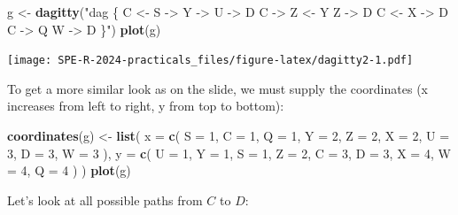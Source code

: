 \documentclass[
]{book}
\newenvironment{Shaded}{\begin{snugshade}}{\end{snugshade}}
\newcommand{\AttributeTok}[1]{\textcolor[rgb]{0.13,0.29,0.53}{#1}}
\newcommand{\DecValTok}[1]{\textcolor[rgb]{0.00,0.00,0.81}{#1}}
\newcommand{\FunctionTok}[1]{\textcolor[rgb]{0.13,0.29,0.53}{\textbf{#1}}}
\newcommand{\NormalTok}[1]{#1}
\newcommand{\OtherTok}[1]{\textcolor[rgb]{0.56,0.35,0.01}{#1}}
\newcommand{\SpecialCharTok}[1]{\textcolor[rgb]{0.81,0.36,0.00}{\textbf{#1}}}
\newcommand{\StringTok}[1]{\textcolor[rgb]{0.31,0.60,0.02}{#1}}
\begin{document}
\begin{Shaded}
\begin{Highlighting}[]
\NormalTok{g }\OtherTok{\textless{}{-}} \FunctionTok{dagitty}\NormalTok{(}\StringTok{"dag \{}
\StringTok{    C \textless{}{-} S {-}\textgreater{} Y {-}\textgreater{} U {-}\textgreater{} D}
\StringTok{    C {-}\textgreater{} Z \textless{}{-} Y}
\StringTok{    Z {-}\textgreater{} D}
\StringTok{    C \textless{}{-} X {-}\textgreater{} D}
\StringTok{    C {-}\textgreater{} Q}
\StringTok{    W {-}\textgreater{} D}
\StringTok{  \}"}\NormalTok{)}
\FunctionTok{plot}\NormalTok{(g)}
\end{Highlighting}
\end{Shaded}

\texttt{[image: SPE-R-2024-practicals\_files/figure-latex/dagitty2-1.pdf]}

To get a more similar look as on the slide, we must supply the coordinates (x increases from left to right, y from top to bottom):

\begin{Shaded}
\begin{Highlighting}[]
\FunctionTok{coordinates}\NormalTok{(g) }\OtherTok{\textless{}{-}} 
  \FunctionTok{list}\NormalTok{(}
    \AttributeTok{x =} 
      \FunctionTok{c}\NormalTok{(}
        \AttributeTok{S =} \DecValTok{1}\NormalTok{, }\AttributeTok{C =} \DecValTok{1}\NormalTok{, }\AttributeTok{Q =} \DecValTok{1}\NormalTok{, }\AttributeTok{Y =} \DecValTok{2}\NormalTok{, }\AttributeTok{Z =} \DecValTok{2}\NormalTok{, }
        \AttributeTok{X =} \DecValTok{2}\NormalTok{, }\AttributeTok{U =} \DecValTok{3}\NormalTok{, }\AttributeTok{D =} \DecValTok{3}\NormalTok{, }\AttributeTok{W =} \DecValTok{3}
\NormalTok{      ),}
    \AttributeTok{y =} 
      \FunctionTok{c}\NormalTok{(}
        \AttributeTok{U =} \DecValTok{1}\NormalTok{, }\AttributeTok{Y =} \DecValTok{1}\NormalTok{, }\AttributeTok{S =} \DecValTok{1}\NormalTok{, }\AttributeTok{Z =} \DecValTok{2}\NormalTok{, }\AttributeTok{C =} \DecValTok{3}\NormalTok{, }
        \AttributeTok{D =} \DecValTok{3}\NormalTok{, }\AttributeTok{X =} \DecValTok{4}\NormalTok{, }\AttributeTok{W =} \DecValTok{4}\NormalTok{, }\AttributeTok{Q =} \DecValTok{4}
\NormalTok{      )}
\NormalTok{  )}
\FunctionTok{plot}\NormalTok{(g)}
\end{Highlighting}
\end{Shaded}

Let's look at all possible paths from \(C\) to \(D\):

\begin{Shaded}
\end{Shaded}
\end{document}
